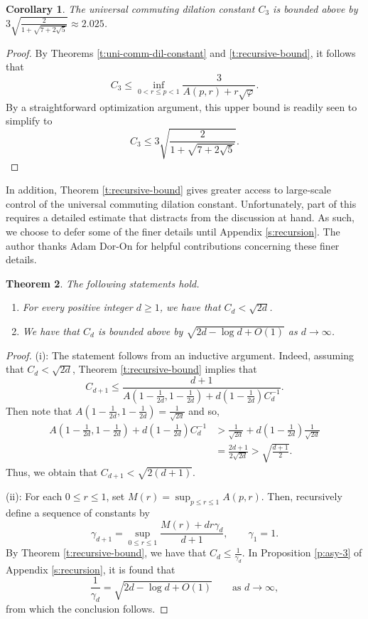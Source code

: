 \documentclass[10pt]{amsart}
\renewcommand{\phi}{\varphi}
\newtheorem{theorem}{Theorem}[section]
\newtheorem{corollary}[theorem]{Corollary}
\begin{document}
\begin{corollary}\label{c:triple-upper}
    The universal commuting dilation constant $C_3$ is bounded above by $ 3\sqrt{\frac{2}{1+\sqrt{7+2\sqrt{5}}}}\approx 2.025$.
\end{corollary}

\begin{proof}
    By Theorems \ref{t:uni-comm-dil-constant} and \ref{t:recursive-bound}, it follows that
    \[
        C_3 \leq \inf_{0<r\leq p<1}\frac{3}{A(p,r) + r\sqrt{\phi}}.
    \]
    By a straightforward optimization argument, this upper bound is readily seen to simplify to
    \[
        C_3 \leq 3\sqrt{\frac{2}{1+\sqrt{7+2\sqrt{5}}}}.
    \]
\end{proof}

In addition, Theorem \ref{t:recursive-bound} gives greater access to large-scale control of the universal commuting dilation constant. Unfortunately, part of this requires a detailed estimate that distracts from the discussion at hand. As such, we choose to defer some of the finer details until Appendix \ref{s:recursion}. The author thanks Adam Dor-On for helpful contributions concerning these finer details.

\begin{theorem}\label{t:asy-bound}
    The following statements hold.
    \begin{enumerate}[{\rm (i)}]
        \item For every positive integer $d\geq1$, we have that $C_d<\sqrt{2d}$.
        \item We have that $C_d$ is bounded above by $\sqrt{2d-\log d + O(1)}$ as $d\rightarrow\infty$.
    \end{enumerate}
\end{theorem}

\begin{proof}
    (i): The statement follows from an inductive argument. Indeed, assuming that $C_d<\sqrt{2d}$, Theorem \ref{t:recursive-bound} implies that
    \[
        C_{d+1}\leq \frac{d+1}{A\left(1-\frac{1}{2d},1-\frac{1}{2d}\right) + d\left(1-\frac{1}{2d}\right)C_d^{-1}}.
    \]
    Then note that $A\left(1-\frac{1}{2d},1-\frac{1}{2d}\right) = \frac{1}{\sqrt{2d}}$ and so,
    \begin{align*}
        A\left(1-\frac{1}{2d},1-\frac{1}{2d}\right) + d\left(1-\frac{1}{2d} \right)C_d^{-1}  & > \frac{1}{\sqrt{2d}} + d\left(1-\frac{1}{2d}\right)\frac{1}{\sqrt{2d}}\\
        & = \frac{2d+1}{2\sqrt{2d}} > \sqrt{\frac{d+1}{2}}.
    \end{align*}
    Thus, we obtain that $C_{d+1}<\sqrt{2(d+1)}$.

    (ii): For each $0\leq r\leq 1$, set $M(r) = \sup_{p\leq r\leq 1} A(p,r)$. Then, recursively define a sequence of constants by
    \[
        \gamma_{d+1} = \sup_{0\leq r\leq 1}\frac{M(r)+dr\gamma_d}{d+1}, \qquad \gamma_1=1.
    \]
    By Theorem \ref{t:recursive-bound}, we have that $C_d\leq \frac{1}{\gamma_d}$. In Proposition \ref{p:asy-3} of Appendix \ref{s:recursion}, it is found that
    \[
        \frac{1}{\gamma_d} = \sqrt{2d-\log d+O(1)} \qquad \text{as $d\rightarrow\infty$},
    \]
    from which the conclusion follows.
\end{proof}
\end{document}
